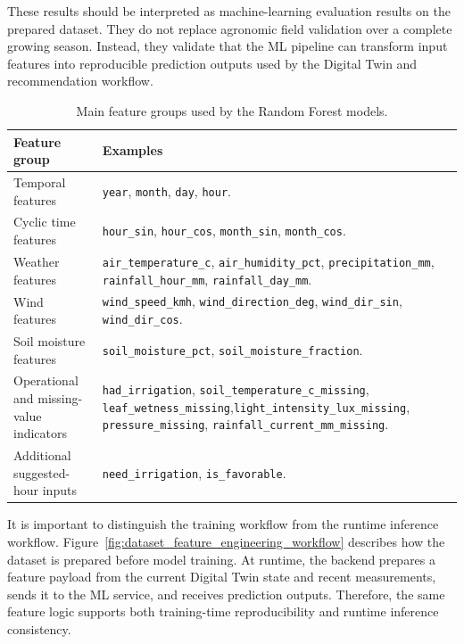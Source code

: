 These results should be interpreted as machine-learning evaluation results on the prepared dataset. They do not replace agronomic field validation over a complete growing season. Instead, they validate that the ML pipeline can transform input features into reproducible prediction outputs used by the Digital Twin and recommendation workflow.

\begin{table}[H]
\centering
\small
\setlength{\tabcolsep}{3pt}
\caption{Main feature groups used by the Random Forest models.}
\label{tab:ml_feature_groups}
\begin{tabular}{p{}p{}}
\hline
\textbf{Feature group} & \textbf{Examples} \\
\hline
Temporal features & \texttt{year}, \texttt{month}, \texttt{day}, \texttt{hour}. \\
Cyclic time features & \texttt{hour\_sin}, \texttt{hour\_cos}, \texttt{month\_sin}, \texttt{month\_cos}. \\
Weather features & \texttt{air\_temperature\_c}, \texttt{air\_humidity\_pct}, \texttt{precipitation\_mm}, \texttt{rainfall\_hour\_mm}, \texttt{rainfall\_day\_mm}. \\
Wind features & \texttt{wind\_speed\_kmh}, \texttt{wind\_direction\_deg}, \texttt{wind\_dir\_sin}, \texttt{wind\_dir\_cos}. \\
Soil moisture features & \texttt{soil\_moisture\_pct}, \texttt{soil\_moisture\_fraction}. \\
Operational and missing-value indicators & \texttt{had\_irrigation}, \texttt{soil\_temperature\_c\_missing}, \texttt{leaf\_wetness\_missing},\newline \texttt{light\_intensity\_lux\_missing}, \texttt{pressure\_missing}, \texttt{rainfall\_current\_mm\_missing}. \\
Additional suggested-hour inputs & \texttt{need\_irrigation}, \texttt{is\_favorable}. \\
\hline
\end{tabular}
\end{table}

It is important to distinguish the training workflow from the runtime inference workflow. Figure~\ref{fig:dataset_feature_engineering_workflow} describes how the dataset is prepared before model training. At runtime, the backend prepares a feature payload from the current Digital Twin state and recent measurements, sends it to the ML service, and receives prediction outputs. Therefore, the same feature logic supports both training-time reproducibility and runtime inference consistency.

